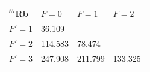 \documentclass{article}
\begin{document}
\begin{appendices}
\begin{table}[]
    \centering
    \begin{tabular}{|l|l|l|l|}
    \hline
    $^{87}$Rb & $F = 0$ & $F = 1$ & $F = 2$ \\ \hline
    $F' = 1$  & 36.109  &         &         \\ \hline
    $F' = 2$  & 114.583 & 78.474  &         \\ \hline
    $F' = 3$  & 247.908 & 211.799 & 133.325 \\ \hline
    \end{tabular}
    \label{tab:crossover_frequencies_Rb87}
\end{table}



\end{appendices}

\pagebreak{}

 
 
\end{document}
